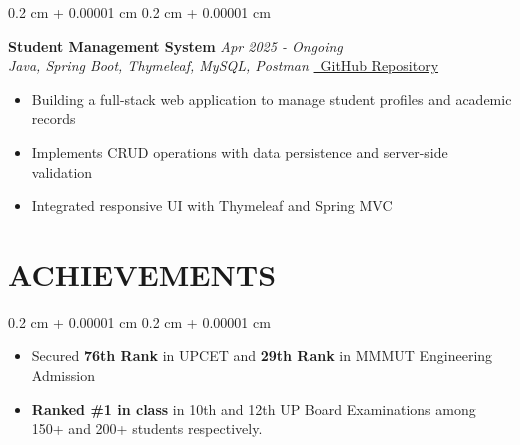 \documentclass[10pt, letterpaper]{article}
\newenvironment{onecolentry}{
    \begin{adjustwidth}{
        0.2 cm + 0.00001 cm
    }{
        0.2 cm + 0.00001 cm
    }
}{
    \end{adjustwidth}
}
\let\hrefWithoutArrow\href
\renewcommand{\href}[2]{\hrefWithoutArrow{#1}{\ifthenelse{\equal{#2}{}}{}{#2 }\raisebox{.15ex}{\footnotesize \faExternalLink*}}}
\newcommand{\githublink}[1]{\hrefWithoutArrow{https://github.com/vishal273007/#1}{\textcolor{primaryColor}{\faGithub\ \small GitHub Repository}}}
\begin{document}
    \begin{onecolentry}
        \textbf{\large Student Management System} \hfill \textit{Apr 2025 - Ongoing} \\
        \textit{Java, Spring Boot, Thymeleaf, MySQL, Postman} \hfill \githublink{student-mgmt-system} \\
        \vspace{0.03cm}
        \begin{itemize}[leftmargin=*,noitemsep,topsep=0pt]
            \item Building a full-stack web application to manage student profiles and academic records
            \item Implements CRUD operations with data persistence and server-side validation
            \item Integrated responsive UI with Thymeleaf and Spring MVC
        \end{itemize}
    \end{onecolentry}
    
    \vspace{0.2 cm}
    
    \section{ACHIEVEMENTS}
    \begin{onecolentry}
        \begin{itemize}[leftmargin=*,noitemsep,topsep=0pt]
            \item Secured \textbf{76th Rank} in UPCET and \textbf{29th Rank} in MMMUT Engineering Admission
            \item \textbf{Ranked \#1 in class} in 10th and 12th UP Board Examinations among 150+ and 200+ students respectively.
        \end{itemize}
    \end{onecolentry}
\end{document}
